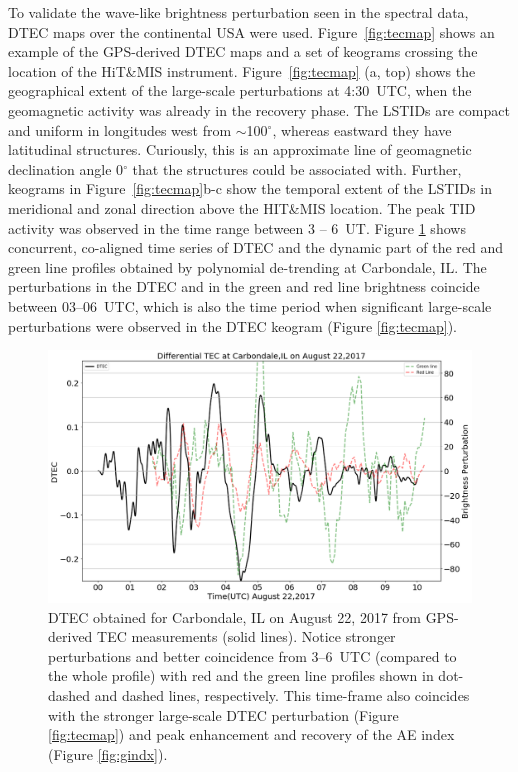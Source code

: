 \documentclass[crop=false,class=mitthesis,oneside,font=12pt]{standalone}
\begin{document}
To validate the wave-like brightness perturbation seen in the spectral data, DTEC maps over the continental USA were used. Figure~\ref{fig:tecmap} shows an example of the GPS-derived DTEC maps and a set of keograms crossing the location of the HiT\&MIS instrument. Figure~\ref{fig:tecmap} (a, top) shows the geographical extent of the large-scale perturbations at 4:30~UTC, when the geomagnetic activity was already in the recovery phase. The LSTIDs are compact and uniform in longitudes west from $\sim$100$^\circ$, whereas eastward they have latitudinal structures. Curiously, this is an approximate line of geomagnetic declination angle 0$^\circ$ that the structures could be associated with. Further, keograms in Figure~\ref{fig:tecmap}b-c show the temporal extent of the LSTIDs in meridional and zonal direction above the HIT\&MIS location. The peak TID activity was observed in the time range between 3 -- 6~UT. Figure \ref{fig:dtec_carb} shows concurrent, co-aligned time series of DTEC and the dynamic part of the red and green line profiles obtained by polynomial de-trending at Carbondale, IL. The perturbations in the DTEC and in the green and red line brightness coincide between 03--06~UTC, which is also the time period when significant large-scale perturbations were observed in the DTEC keogram (Figure \ref{fig:tecmap}). 

\begin{figure}[H]
	\centering\includegraphics[width=35pc]{aug22_dtec_bper.png}
	\caption{DTEC obtained for Carbondale, IL on August 22, 2017 from GPS-derived TEC measurements (solid lines).  Notice stronger perturbations  and better coincidence from 3--6~UTC (compared to the whole profile) with red and the green line profiles shown in dot-dashed and dashed lines, respectively. This time-frame also coincides with the stronger large-scale DTEC perturbation (Figure \ref{fig:tecmap}) and peak enhancement and recovery of the AE index (Figure \ref{fig:gindx}).}
	\label{fig:dtec_carb}
\end{figure}
\end{document}
